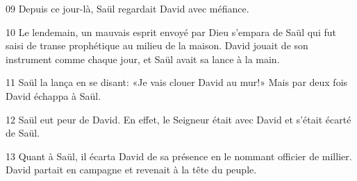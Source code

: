 
09 Depuis ce jour-là, Saül regardait David avec méfiance.

10 Le lendemain, un mauvais esprit envoyé par Dieu s’empara de Saül qui fut saisi de transe prophétique au milieu de la maison. David jouait de son instrument comme chaque jour, et Saül avait sa lance à la main.

11 Saül la lança en se disant: «Je vais clouer David au mur!» Mais par deux fois David échappa à Saül.

12 Saül eut peur de David. En effet, le Seigneur était avec David et s’était écarté de Saül.

13 Quant à Saül, il écarta David de sa présence en le nommant officier de millier. David partait en campagne et revenait à la tête du peuple.
